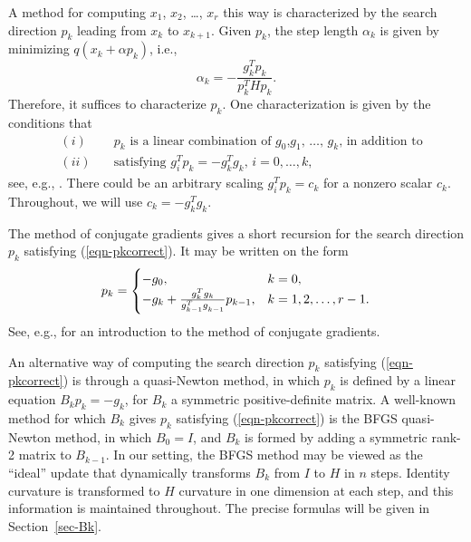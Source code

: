 \documentclass[11pt,twoside]{article}
\begin{document}
A method for computing $x_1$, $x_2$, \dots, $x_r$ this way is
characterized by the search direction $p_k$ leading from $x_k$ to
$x_{k+1}$. Given $p_k$, the step length $\alpha_k$ is given by
minimizing $q(x_k+\alpha p_k)$, i.e.,
\begin{equation}\label{eqn-exactlinesearch}
\alpha_k = - \frac {g_k^T p_k}{p_k^T H p_k}.
\end{equation}
Therefore, it suffices to characterize $p_k$. One characterization is
given by the conditions that
\begin{subequations} \label{eqn-pkcorrect}
\begin{eqnarray}
& (i) \quad & \mbox{$p_k$ is a linear combination of $g_0$,
$g_1$, $\dots$, $g_k$, in addition to} \\
& (ii) \quad & \mbox{satisfying $g_i^T p_k = -g_k^T g_k$, $i=0,\dots,k,$}
\end{eqnarray}
\end{subequations}
see, e.g., \cite[Lemma 1]{EF21}. There could be an arbitrary scaling $g_i^T
p_k=c_k$ for a nonzero scalar $c_k$. Throughout, we will use
$c_k=-g_k^T g_k$.

The method of conjugate gradients gives a short recursion for the
search direction $p_k$ satisfying (\ref{eqn-pkcorrect}). It may be
written on the form
\begin{equation}\label{eqn-pkCG}
p_k =
\begin{cases}
-g_0, & k = 0, \\
-g_{k} + \frac{g_k^T g_k}{g_{k-1}^T g_{k-1}\drop} p_{k-1}, &
k=1,2,\dots,r-1.
\end{cases}
\end{equation}
See, e.g., \cite[Chapter 6]{Saa95} for an introduction to the method
of conjugate gradients.

An alternative way of computing the search direction $p_k$ satisfying
(\ref{eqn-pkcorrect}) is through a quasi-Newton method, in which $p_k$
is defined by a linear equation $B_k p_k=-g_k$, for $B_k$ a symmetric
positive-definite matrix. A well-known method for which $B_k$ gives
$p_k$ satisfying (\ref{eqn-pkcorrect}) is the BFGS quasi-Newton
method, in which $B_0=I$, and $B_{k}$ is formed by adding a symmetric
rank-2 matrix to $B_{k-1}$. In our setting, the BFGS method may be
viewed as the ``ideal'' update that dynamically transforms $B_k$ from
$I$ to $H$ in $n$ steps. Identity curvature is transformed to $H$
curvature in one dimension at each step, and this information is
maintained throughout. The precise formulas will be given in
Section~\ref{sec-Bk}.
\end{document}
